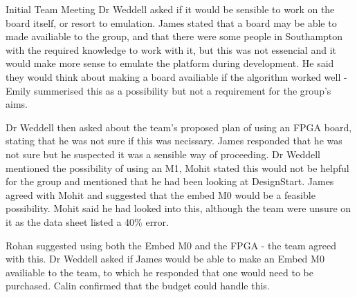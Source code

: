 \documentclass{article}
\begin{document}
\begin{Minutes}{Initial Team Meeting}
Dr Weddell asked if it would be sensible to work on the board itself, or resort to emulation. James
stated that a board may be able to made availiable to the group, and that there were some people in
Southampton with the required knowledge to work with it, but this was not essencial and it would
make more sense to emulate the platform during development. He said they would think about making a
board availiable if the algorithm worked well - Emily summerised this as a possibility but not a
requirement for the group's aims.

Dr Weddell then asked about the team's proposed plan of using an FPGA board, stating that he was not
sure if this was necissary. James responded that he was not sure but he suspected it was a sensible
way of proceeding. Dr Weddell mentioned the possibility of using an M1, Mohit stated this would not
be helpful for the group and mentioned that he had been looking at DesignStart. James agreed with
Mohit and suggested that the embed M0 would be a feasible possibility. Mohit said he had looked into
this, although the team were unsure on it as the data sheet listed a 40\% error.

Rohan suggested using both the Embed M0 and the FPGA - the team agreed with this. Dr Weddell asked if
James would be able to make an Embed M0 availiable to the team, to which he responded that one would
need to be purchased. Calin confirmed that the budget could handle this.


\end{Minutes}
\end{document}
